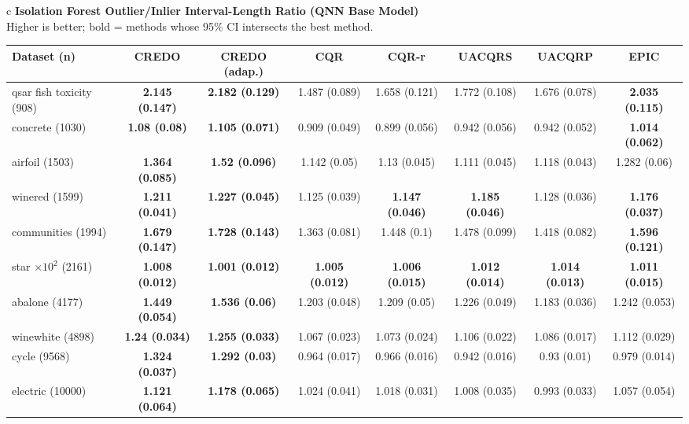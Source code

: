 \documentclass[border=6pt]{standalone}
\begin{document}
\begin{adjustbox}{max width=\linewidth}
\begin{tabular}{c}
{\small\textbf{Isolation Forest Outlier/Inlier Interval-Length Ratio (QNN Base Model)}}\\[-1pt]
{\scriptsize Higher is better; bold = methods whose 95\% CI intersects the best method.}\\[2pt]
\scriptsize\begin{tabular}{lccccccc}
\hline
Dataset (n) & \textbf{CREDO} & \textbf{CREDO (adap.)} & \textbf{CQR} & \textbf{CQR-r} & \textbf{UACQRS} & \textbf{UACQRP} & \textbf{EPIC}\\ \hline
qsar fish toxicity (908) & \textbf{2.145 (0.147)} & \textbf{2.182 (0.129)} & 1.487 (0.089) & 1.658 (0.121) & 1.772 (0.108) & 1.676 (0.078) & \textbf{2.035 (0.115)}\\
concrete (1030) & \textbf{1.08 (0.08)} & \textbf{1.105 (0.071)} & 0.909 (0.049) & 0.899 (0.056) & 0.942 (0.056) & 0.942 (0.052) & \textbf{1.014 (0.062)}\\
airfoil (1503) & \textbf{1.364 (0.085)} & \textbf{1.52 (0.096)} & 1.142 (0.05) & 1.13 (0.045) & 1.111 (0.045) & 1.118 (0.043) & 1.282 (0.06)\\
winered (1599) & \textbf{1.211 (0.041)} & \textbf{1.227 (0.045)} & 1.125 (0.039) & \textbf{1.147 (0.046)} & \textbf{1.185 (0.046)} & 1.128 (0.036) & \textbf{1.176 (0.037)}\\
communities (1994) & \textbf{1.679 (0.147)} & \textbf{1.728 (0.143)} & 1.363 (0.081) & 1.448 (0.1) & 1.478 (0.099) & 1.418 (0.082) & \textbf{1.596 (0.121)}\\
star $\times 10^2$ (2161) & \textbf{1.008 (0.012)} & \textbf{1.001 (0.012)} & \textbf{1.005 (0.012)} & \textbf{1.006 (0.015)} & \textbf{1.012 (0.014)} & \textbf{1.014 (0.013)} & \textbf{1.011 (0.015)}\\
abalone (4177) & \textbf{1.449 (0.054)} & \textbf{1.536 (0.06)} & 1.203 (0.048) & 1.209 (0.05) & 1.226 (0.049) & 1.183 (0.036) & 1.242 (0.053)\\
winewhite (4898) & \textbf{1.24 (0.034)} & \textbf{1.255 (0.033)} & 1.067 (0.023) & 1.073 (0.024) & 1.106 (0.022) & 1.086 (0.017) & 1.112 (0.029)\\
cycle (9568) & \textbf{1.324 (0.037)} & \textbf{1.292 (0.03)} & 0.964 (0.017) & 0.966 (0.016) & 0.942 (0.016) & 0.93 (0.01) & 0.979 (0.014)\\
electric (10000) & \textbf{1.121 (0.064)} & \textbf{1.178 (0.065)} & 1.024 (0.041) & 1.018 (0.031) & 1.008 (0.035) & 0.993 (0.033) & 1.057 (0.054)\\

\end{tabular}
\end{tabular}
\end{adjustbox}
\end{document}
